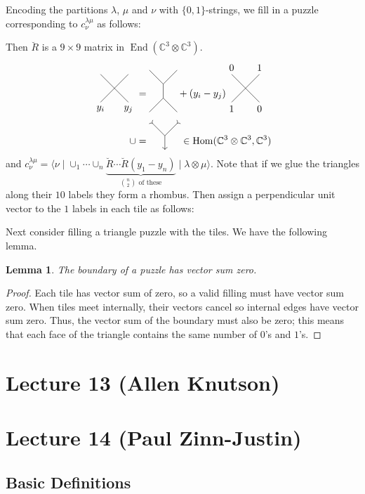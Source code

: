\documentclass[12pt]{amsart}
\numberwithin{equation}{section}
\newtheorem{Lemma}[equation]{Lemma}
\theoremstyle{definition}
\numberwithin{figure}{section}
\newcommand{\C}{\mathbb{C}}
\newcommand{\End}{\operatorname{End}}
\newcommand{\Hom}{\operatorname{Hom}}
\newcommand{\Rcheck}{\breve{R}}
\begin{document}
Encoding the partitions $\lambda$, $\mu$ and $\nu$ with $\{0,1\}$-strings, we fill in a puzzle corresponding to $c_\nu^{\lambda\mu}$ as follows: 

Then $\Rcheck$ is a $9\times9$ matrix in $\End(\C^3\otimes\C^3)$.
\begin{align*}
    \tikz[baseline=6]{\draw(0,0)node[below]{$y_i$}--++(1,1);\draw(1,0)node[below]{$y_j$}--++(-1,1)} &=
    \tikz[baseline=16]{\draw(0,0)--++(1/2,1/2)--++(0,1/2)--++(-1/2,1/2);\draw(1/2,1)--++(1/2,1/2);\draw(1/2,1/2)--++(1/2,-1/2)} +
    (y_i-y_j)
    \tikz[baseline=6]{\draw(0,0)node[below]{$1$}--++(1,1)node[above]{$1$};\draw(1,0)node[below]{$0$}--++(-1,1)node[above]{$0$}} \\
    \cup &=
    \tikz[baseline=6]{\draw[>-](0,1)--++(1/2,-1/2);\draw[>-](1,1)--++(-1/2,-1/2);\draw[->](1/2,1/2)--++(0,-1/2)}
    \in \Hom(\C^3\otimes\C^3,\C^3)
\end{align*}
and $c_\nu^{\lambda\mu}=\langle\nu\mid\cup_1\cdots\cup_n\underbrace{\Rcheck\cdots\Rcheck(y_1-y_n)}_{\binom{n}{2}\text{ of these}}\mid\lambda\otimes\mu\rangle$. Note that if we glue the triangles along their $10$ labels they form a rhombus. Then assign a perpendicular unit vector to the $1$ labels in each tile as follows: 

Next consider filling a triangle puzzle with the tiles. We have the following lemma.
\begin{Lemma}
    The boundary of a puzzle has vector sum zero.
\end{Lemma}
\begin{proof}
    Each tile has vector sum of zero, so a valid filling must have vector sum zero. When tiles meet internally, their vectors cancel so internal edges have vector sum zero. Thus, the vector sum of the boundary must also be zero; this means that each face of the triangle contains the same number of $0$'s and $1$'s.
\end{proof}

\section{Lecture 13 (Allen Knutson)}

\section{Lecture 14 (Paul Zinn-Justin)}

\subsection{Basic Definitions}
\end{document}
